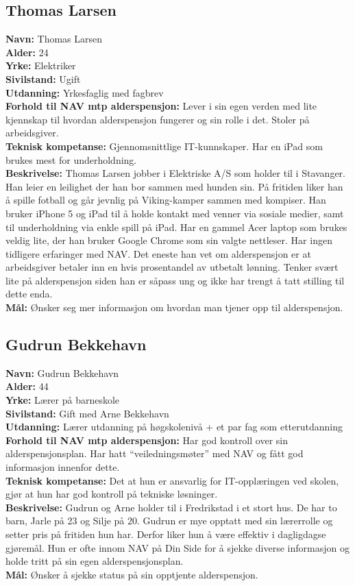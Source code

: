 \documentclass[informationsecurity]{gucmasterproject}
\begin{document}
\subsection{Thomas Larsen}
\textbf{Navn:} Thomas Larsen \\
\textbf{Alder:} 24 \\
\textbf{Yrke:} Elektriker \\
\textbf{Sivilstand:} Ugift \\
\textbf{Utdanning:} Yrkesfaglig med fagbrev \\
\textbf{Forhold til NAV mtp alderspensjon:} Lever i sin egen verden med lite kjennskap til hvordan alderspensjon fungerer og sin rolle i det. Stoler på arbeidsgiver. \\
\textbf{Teknisk kompetanse:} Gjennomsnittlige IT-kunnskaper. Har en iPad som brukes mest for underholdning. \\
\textbf{Beskrivelse:} Thomas Larsen jobber i Elektriske A/S som holder til i Stavanger. Han leier en leilighet der han bor sammen med hunden sin. På fritiden liker han å spille fotball og går jevnlig på Viking-kamper sammen med kompiser. Han bruker iPhone 5 og iPad til å holde kontakt med venner via sosiale medier, samt til underholdning via enkle spill på iPad. Har en gammel Acer laptop som brukes veldig lite, der han bruker Google Chrome som sin valgte nettleser. Har ingen tidligere erfaringer med NAV. Det eneste han vet om alderspensjon er at arbeidsgiver betaler inn en hvis prosentandel av utbetalt lønning. Tenker svært lite på alderspensjon siden han er såpass ung og ikke har trengt å tatt stilling til dette enda. \\
\textbf{Mål:} Ønsker seg mer informasjon om hvordan man tjener opp til alderspensjon. \\


\subsection{Gudrun Bekkehavn}
\textbf{Navn:} Gudrun Bekkehavn \\
\textbf{Alder:} 44 \\
\textbf{Yrke:} Lærer på barneskole \\
\textbf{Sivilstand:} Gift med Arne Bekkehavn \\
\textbf{Utdanning:} Lærer utdanning på høgskolenivå + et par fag som etterutdanning \\
\textbf{Forhold til NAV mtp alderspensjon:} Har god kontroll over sin alderspensjonsplan. Har hatt “veiledningsmøter” med NAV og fått god informasjon innenfor dette. \\
\textbf{Teknisk kompetanse:} Det at hun er ansvarlig for IT-opplæringen ved skolen, gjør at hun har god kontroll på tekniske løsninger. \\
\textbf{Beskrivelse:} Gudrun og Arne holder til i Fredrikstad i et stort hus. De har to barn, Jarle på 23 og Silje på 20. Gudrun er mye opptatt med sin lærerrolle og setter pris på fritiden hun har. Derfor liker hun å være effektiv i dagligdagse gjøremål. Hun er ofte innom NAV på Din Side for å sjekke diverse informasjon og holde tritt på sin egen alderspensjonsplan. \\
\textbf{Mål:} Ønsker å sjekke status på sin opptjente alderspensjon.
\end{document}
